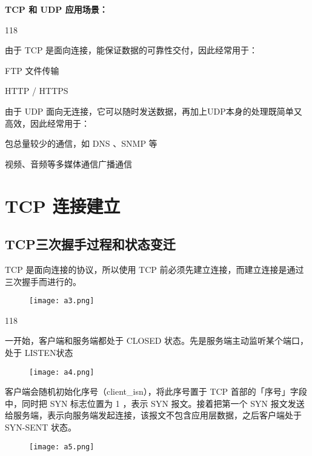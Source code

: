 \documentclass[cn,chinese,color=cyan]{elegantbook}
\begin{document}
\textbf{TCP 和 UDP 应用场景：}

\begin{dinglist}{118}
	\item 由于 TCP 是面向连接，能保证数据的可靠性交付，因此经常用于：
	
	FTP 文件传输
	
	HTTP / HTTPS
	
	\item 由于 UDP 面向无连接，它可以随时发送数据，再加上UDP本身的处理既简单又高效，因此经常用于：
	
	包总量较少的通信，如 DNS 、SNMP 等
	
	视频、音频等多媒体通信广播通信
\end{dinglist}

\section{TCP 连接建立}
\subsection{TCP三次握手过程和状态变迁}
TCP 是面向连接的协议，所以使用 TCP 前必须先建立连接，而建立连接是通过三次握手而进行的。
\begin{figure}[H]
	\centering
	\texttt{[image: a3.png]}
\end{figure}
\begin{dinglist}{118}
	\item 一开始，客户端和服务端都处于 CLOSED 状态。先是服务端主动监听某个端口，处于 LISTEN状态
	\begin{figure}[H]
		\centering
		\texttt{[image: a4.png]}
	\end{figure}

\item 客户端会随机初始化序号（client\_isn），将此序号置于 TCP 首部的「序号」字段中，同时把 SYN 标志位置为 1 ，表示 SYN 报文。接着把第一个 SYN 报文发送给服务端，表示向服务端发起连接，该报文不包含应用层数据，之后客户端处于 SYN-SENT 状态。
	\begin{figure}[H]
	\centering
	\texttt{[image: a5.png]}
\end{figure}







\end{dinglist}
\end{document}
